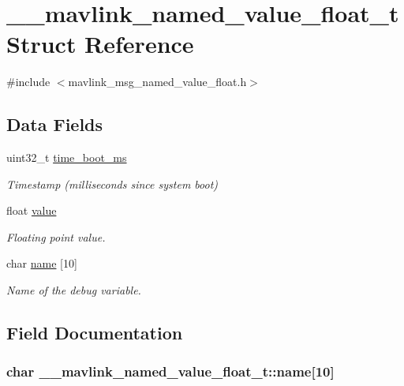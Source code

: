 \hypertarget{struct____mavlink__named__value__float__t}{\section{\+\_\+\+\_\+mavlink\+\_\+named\+\_\+value\+\_\+float\+\_\+t Struct Reference}
\label{struct____mavlink__named__value__float__t}
}


{\ttfamily \#include $<$mavlink\+\_\+msg\+\_\+named\+\_\+value\+\_\+float.\+h$>$}

\subsection*{Data Fields}
\begin{DoxyCompactItemize}
\item 
uint32\+\_\+t \hyperlink{struct____mavlink__named__value__float__t_a46e6c60e5c779ce8f3e808c485aa620f}{time\+\_\+boot\+\_\+ms}
\begin{DoxyCompactList}\small\item\em Timestamp (milliseconds since system boot) \end{DoxyCompactList}\item 
float \hyperlink{struct____mavlink__named__value__float__t_a44c8c857d4e8732bccb9ef9ed1e2a386}{value}
\begin{DoxyCompactList}\small\item\em Floating point value. \end{DoxyCompactList}\item 
char \hyperlink{struct____mavlink__named__value__float__t_a1e916005f34f9fffc7144d8b71b890d8}{name} \mbox{[}10\mbox{]}
\begin{DoxyCompactList}\small\item\em Name of the debug variable. \end{DoxyCompactList}\end{DoxyCompactItemize}


\subsection{Field Documentation}
\hypertarget{struct____mavlink__named__value__float__t_a1e916005f34f9fffc7144d8b71b890d8}{
\subsubsection[{name}]{\setlength{\rightskip}{0pt plus 5cm}char \+\_\+\+\_\+mavlink\+\_\+named\+\_\+value\+\_\+float\+\_\+t\+::name\mbox{[}10\mbox{]}}}\label{struct____mavlink__named__value__float__t_a1e916005f34f9fffc7144d8b71b890d8}


